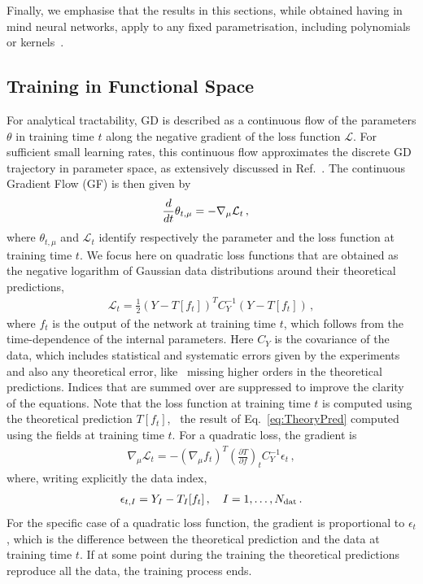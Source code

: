 Finally, we emphasise that the results in this sections, while obtained having in mind
neural networks, apply to any fixed parametrisation, including polynomials or
kernels~\cite{Costantini:2025wxp}.

\subsection{Training in Functional Space}
\label{sec:GradFlow}

For analytical tractability, GD is described as a continuous flow of the
parameters $\theta$ in training time $t$ along the negative gradient of the loss
function $\mathcal{L}$. For sufficient small learning rates, this continuous
flow approximates the discrete GD trajectory in parameter space, as extensively
discussed in Ref.~\cite{barrett2022igr}. The continuous Gradient Flow (GF) is
then given by
\begin{align}
    \label{eq:GradientFlowDef}
    \frac{d}{dt} &\theta_{t,\mu} = -\nabla_\mu \mathcal{L}_t\, ,
\end{align}
where $\theta_{t,\mu}$ and $\mathcal{L}_t$ identify respectively the parameter
and the loss function at training time $t$. We focus here on quadratic loss
functions that are obtained as the negative logarithm of Gaussian data
distributions around their theoretical predictions,
\begin{align}
    \label{eq:QuadLoss}
    \mathcal{L}_t = \frac12 \left(Y - T[f_t]\right)^T C_Y^{-1} \left(Y - T[f_t]\right)\, ,
\end{align}
where $f_t$ is the output of the network at training time $t$, which follows
from the time-dependence of the internal parameters. Here $C_Y$ is the
covariance of the data, which includes statistical and systematic errors given
by the experiments and also any theoretical error, like \eg\ missing higher
orders in the theoretical predictions. Indices that are summed over are
suppressed to improve the clarity of the equations. Note that the loss function
at training time $t$ is computed using the theoretical prediction $T[f_t]$, \ie\
the result of Eq.~\eqref{eq:TheoryPred} computed using the fields at training
time $t$. For a quadratic loss, the gradient is
\begin{align}
    \nabla_\mu \mathcal{L}_t = - \left(\nabla_\mu f_t\right)^T \left(\frac{\partial T}{\partial f}\right)_t
      C_Y^{-1} \epsilon_t\, ,
\end{align}
where, writing explicitly the data index,
\begin{align}
    \label{eq:EpsDef}
    \epsilon_{t,I} = Y_I - T_I[f_t]\, , \quad I=1, \ldots, N_{\mathrm{dat}}\, .
\end{align}
For the specific case of a quadratic loss function, the gradient is proportional
to $\epsilon_t$, which is the difference between the theoretical prediction and
the data at training time $t$. If at some point during the training the
theoretical predictions reproduce all the data, the training process ends. 

